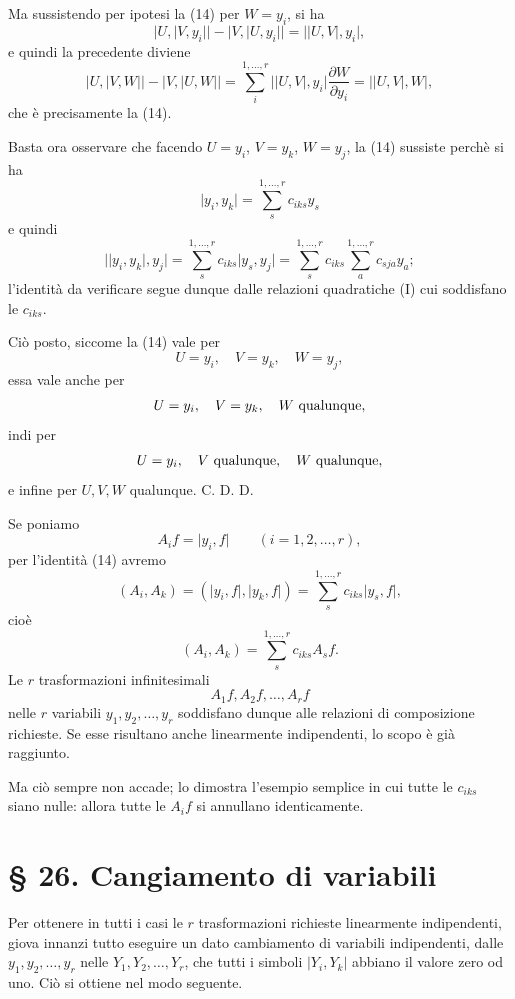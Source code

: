 \documentclass[11pt]{book}
\begin{document}
Ma sussistendo per ipotesi la (14) per $W=y_i$, si ha
\[
 \lvert U,\lvert V,y_i\rvert\rvert-
 \lvert V,\lvert U,y_i\rvert\rvert=
 \lvert\lvert U,V\rvert,y_i\rvert,
\]
e quindi la precedente diviene
\[
 \lvert U,\lvert V,W\rvert\rvert-
 \lvert V,\lvert U,W\rvert\rvert
 =\sum\limits_i^{1,\ldots,r}\lvert\lvert U,V\rvert,y_i\rvert\frac{\partial W}{\partial y_i}
 =\lvert\lvert U,V\rvert,W\rvert,
\]
che è precisamente la (14).

Basta ora osservare che facendo $U=y_i$, $V=y_k$, $W=y_j$, la (14) sussiste perchè si ha
\[
 \lvert y_i,y_k\rvert=\sum\limits_s^{1,\ldots,r}c_{iks}y_s
\]
e quindi
\[
 \lvert\lvert y_i,y_k\rvert,y_j\rvert
 =\sum\limits_s^{1,\ldots,r} c_{iks}\lvert y_s,y_j\rvert
 =\sum\limits_s^{1,\ldots,r} c_{iks}\sum\limits_a^{1,\ldots,r} c_{sja}y_a;
\]
l'identità da verificare segue dunque dalle relazioni quadratiche (I) cui soddisfano le $c_{iks}$.

Ciò posto, siccome la (14) vale per
\[
 U=y_i,
 \quad V=y_k,
 \quad W=y_j,
\]
essa vale anche per
\[
 U=y_i,
 \quad V=y_k,
 \quad W\hbox{ qualunque},
\]
indi per
\[
 U=y_i,
 \quad V\hbox{ qualunque},
 \quad W\hbox{ qualunque},
\]
e infine per $U,V,W$ qualunque. C. D. D.

Se poniamo
\[
 A_if=\lvert y_i,f\rvert\qquad(i=1,2,\ldots,r),
\]
per l'identità (14) avremo
\[
 (A_i,A_k)=(\lvert y_i,f\rvert,\lvert y_k,f\rvert)=
 \sum\limits_s^{1,\ldots,r} c_{iks}\lvert y_s,f\rvert,
\]
cioè
\[
 (A_i,A_k)=\sum\limits_s^{1,\ldots,r} c_{iks}A_s f.
\]
Le $r$ trasformazioni infinitesimali
\[
 A_1f,A_2f,\ldots,A_rf
\]
nelle $r$ variabili $y_1,y_2,\ldots,y_r$ soddisfano dunque alle relazioni di composizione richieste. Se esse risultano anche linearmente indipendenti, lo scopo è già raggiunto.

Ma ciò sempre non accade; lo dimostra l'esempio semplice in cui tutte le $c_{iks}$ siano nulle: allora tutte le $A_if$ si annullano identicamente.

\section*{\S{} 26. Cangiamento di variabili}

Per ottenere in tutti i casi le $r$ trasformazioni richieste linearmente indipendenti, giova innanzi tutto eseguire un dato cambiamento di variabili indipendenti, dalle $y_1,y_2,\ldots,y_r$ nelle $Y_1,Y_2,\ldots,Y_r$, che tutti i simboli $\lvert Y_i,Y_k\rvert$ abbiano il valore zero od uno. Ciò si ottiene nel modo seguente.
\end{document}
